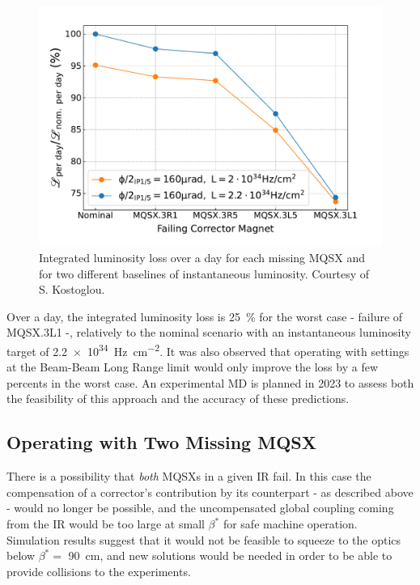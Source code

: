 \begin{figure}[!htb]
    \centering
    \includegraphics*[width=\textwidth]{Figures/IR_Coupling_Correction/carry_over_integrated_lumi.pdf}
    \caption{Integrated luminosity loss over a day for each missing MQSX and for two different baselines of instantaneous luminosity. Courtesy of S. Kostoglou.}
    \label{figure:integrated_lumi_losses}
\end{figure}

Over a day, the integrated luminosity loss is \qty{25}{\percent} for the worst case - failure of MQSX.3L1 -, relatively to the nominal scenario with an instantaneous luminosity target of \qty{2.2e34}{\hertz\per\square\centi\meter}.
It was also observed that operating with settings at the Beam-Beam Long Range limit would only improve the loss by a few percents in the worst case.
An experimental MD is planned in \num{2023} to assess both the feasibility of this approach and the accuracy of these predictions.

\subsection{Operating with Two Missing MQSX}

There is a possibility that \textit{both} MQSXs in a given IR fail.
In this case the compensation of a corrector's contribution by its counterpart - as described above - would no longer be possible, and the uncompensated global coupling coming from the IR would be too large at small \(\beta^{\ast}\) for safe machine operation.
Simulation results suggest that it would not be feasible to squeeze to the optics below \(\beta^{\ast} =\) \qty{90}{\centi\meter}, and new solutions would be needed in order to be able to provide collisions to the experiments.

